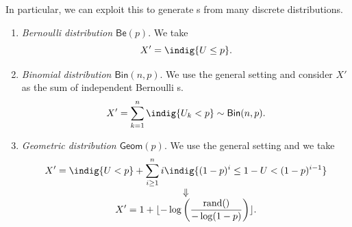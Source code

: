 \documentclass[12pt]{report}
\begin{document}
In particular, we can exploit this to generate \rv s from many discrete distributions.
\begin{enumerate}[\circnum]
	\item \emph{Bernoulli distribution $\mathsf{Be}(p)$}. We take
	\begin{equation*}
		X'=\indig{U\leq p}.
	\end{equation*}
	\item \emph{Binomial distribution $\mathsf{Bin}(n,p)$}. We use the general setting and consider $X'$ as the sum of independent Bernoulli \rv s.
	\begin{equation*}
		X'=\sum_{k=1}^{n}\indig{U_{k}<p}\sim\mathsf{Bin}(n,p).
	\end{equation*}
	\item \emph{Geometric distribution $\mathsf{Geom}(p)$}. We use the general setting and we take
	\begin{equation*}
		\begin{array}{>{\displaystyle}c}
			X'=\indig{U<p}+\sum_{i\geq 1}^{n}i\indig{(1-p)^{i}\leq 1-U<(1-p)^{i-1}}\\
			\Downarrow\\
			X'=1+\lfloor-\log\left(\frac{\mathrm{rand}()}{-\log(1-p)}\right)\rfloor.
		\end{array}
	\end{equation*}
\end{enumerate}
\end{document}
